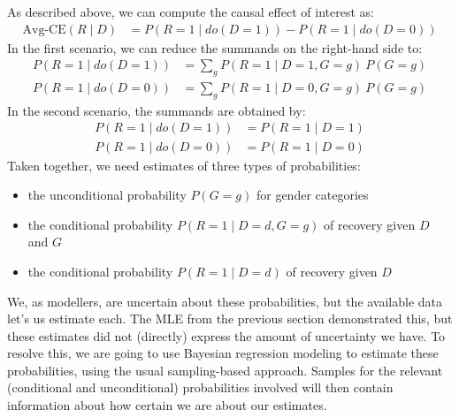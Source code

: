 \documentclass[nobib]{tufte-handout}
\newcommand{\mathdo}{\mathit{do}}
\begin{document}
As described above, we can compute the causal effect of interest as:
\begin{align*}
  \text{Avg-CE}(R \mid D) & =  P\left(R=1 \mid \mathdo(D=1)\right) - P\left(R=1 \mid \mathdo(D=0)\right)
\end{align*}
In the first scenario, we can reduce the summands on the right-hand side to:
\begin{align*}
  P\left(R=1 \mid \mathdo(D=1)\right) &= \sum_{g} P\left(R = 1 \mid D=1, G=g \right) \ P\left( G=g \right) \\
  P\left(R=1 \mid \mathdo(D=0)\right) &= \sum_{g} P\left(R = 1 \mid D=0, G=g \right) \ P\left( G=g \right)
\end{align*}
In the second scenario, the summands are obtained by:
\begin{align*}
  P\left(R=1 \mid \mathdo(D=1)\right) &= P\left(R=1\mid D=1 \right) \\
  P\left(R=1 \mid \mathdo(D=0)\right) &= P\left(R=1\mid D=0 \right)
\end{align*}
Taken together, we need estimates of three types of probabilities:
\begin{itemize}
  \item the unconditional probability $P(G=g)$ for gender categories
  \item the conditional probability $P(R=1 \mid D=d, G=g)$ of recovery given $D$ and $G$
  \item the conditional probability $P(R=1 \mid D=d)$ of recovery given $D$
\end{itemize}
We, as modellers, are uncertain about these probabilities, but the available data let's us estimate each.
The MLE from the previous section demonstrated this, but these estimates did not (directly) express the amount of uncertainty we have.
To resolve this, we are going to use Bayesian regression modeling to estimate these probabilities, using the usual sampling-based approach.
Samples for the relevant (conditional and unconditional) probabilities involved will then contain information about how certain we are about our estimates.
\end{document}
